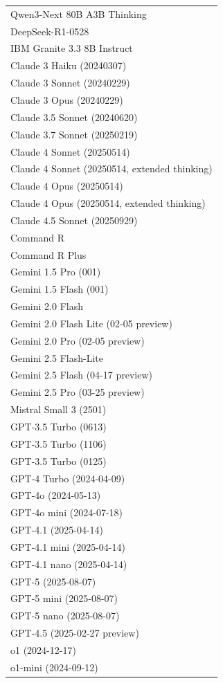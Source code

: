 \begin{table}[htp]
{\begin{tabular}{l}
Qwen3-Next 80B A3B Thinking \\
DeepSeek-R1-0528 \\
IBM Granite 3.3 8B Instruct \\
Claude 3 Haiku (20240307) \\
Claude 3 Sonnet (20240229) \\
Claude 3 Opus (20240229) \\
Claude 3.5 Sonnet (20240620) \\
Claude 3.7 Sonnet (20250219) \\
Claude 4 Sonnet (20250514) \\
Claude 4 Sonnet (20250514, extended thinking) \\
Claude 4 Opus (20250514) \\
Claude 4 Opus (20250514, extended thinking) \\
Claude 4.5 Sonnet (20250929) \\
Command R \\
Command R Plus \\
Gemini 1.5 Pro (001) \\
Gemini 1.5 Flash (001) \\
Gemini 2.0 Flash \\
Gemini 2.0 Flash Lite (02-05 preview) \\
Gemini 2.0 Pro (02-05 preview) \\
Gemini 2.5 Flash-Lite \\
Gemini 2.5 Flash (04-17 preview) \\
Gemini 2.5 Pro (03-25 preview) \\
Mistral Small 3 (2501) \\
GPT-3.5 Turbo (0613) \\
GPT-3.5 Turbo (1106) \\
GPT-3.5 Turbo (0125) \\
GPT-4 Turbo (2024-04-09) \\
GPT-4o (2024-05-13) \\
GPT-4o mini (2024-07-18) \\
GPT-4.1 (2025-04-14) \\
GPT-4.1 mini (2025-04-14) \\
GPT-4.1 nano (2025-04-14) \\
GPT-5 (2025-08-07) \\
GPT-5 mini (2025-08-07) \\
GPT-5 nano (2025-08-07) \\
GPT-4.5 (2025-02-27 preview) \\
o1 (2024-12-17) \\
o1-mini (2024-09-12) \\

\end{tabular}}
\end{table}
